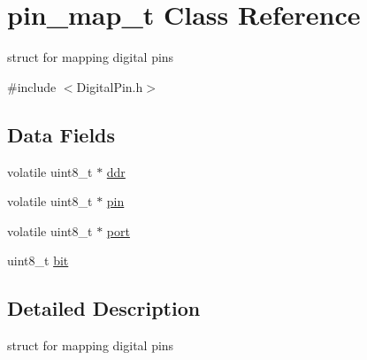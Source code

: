 \hypertarget{structpin__map__t}{\section{pin\-\_\-map\-\_\-t Class Reference}
\label{structpin__map__t}
}


struct for mapping digital pins  




{\ttfamily \#include $<$Digital\-Pin.\-h$>$}

\subsection*{Data Fields}
\begin{DoxyCompactItemize}
\item 
volatile uint8\-\_\-t $\ast$ \hyperlink{structpin__map__t_a225c54cc8b3ba811dbe558c560efe231}{ddr}
\item 
volatile uint8\-\_\-t $\ast$ \hyperlink{structpin__map__t_a70d5589f6a5444b492f4d93969969543}{pin}
\item 
volatile uint8\-\_\-t $\ast$ \hyperlink{structpin__map__t_adfcfd7f304a337776b36f479221f197c}{port}
\item 
uint8\-\_\-t \hyperlink{structpin__map__t_ad15e9d6879273cee61ab5b915db182a7}{bit}
\end{DoxyCompactItemize}


\subsection{Detailed Description}
struct for mapping digital pins 

